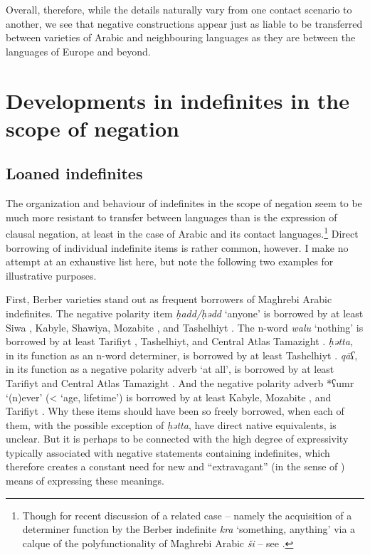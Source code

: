 \documentclass[output=paper]{langsci/langscibook}
\begin{document}
Overall, therefore, while the details naturally vary from one contact scenario to another, we see that negative constructions appear just as liable to be transferred between varieties of Arabic and neighbouring languages as they are between the languages of Europe and beyond.


\section{Developments in indefinites in the scope of negation}\label{sec:sco}


\subsection{Loaned indefinites}


The organization and behaviour of indefinites in the scope of negation seem to be much more resistant to transfer between languages than is the expression of clausal negation, at least in the case of Arabic and its contact languages.\footnote{Though for recent discussion of a related case – namely the acquisition of a determiner function by the Berber indefinite \textit{kra} ‘something, anything’ via a calque of the polyfunctionality of Maghrebi Arabic \textit{ši\-} – see \citet{Souag2018thing}.} Direct borrowing of individual indefinite items is rather common, however. I make no attempt at an exhaustive list here, but note the following two examples for illustrative purposes. 

First, Berber varieties stand out as frequent borrowers of Maghrebi Arabic indefinites. The negative polarity item \textit{ḥadd/ḥədd} ‘anyone’ is borrowed by at least Siwa \citep[58]{Souag2009}, Kabyle, Shawiya, Mozabite \citep[29]{Rabhi1996}, and Tashelhiyt \citep[41]{Boumalk1996}. The n-word \textit{walu} ‘nothing’ is borrowed by at least Tarifiyt \citep[54]{Lafkioui1996}, Tashelhiyt, and Central Atlas Tamazight \citep[41]{Boumalk1996}. \textit{ḥətta}, in its function as an n-word determiner, is borrowed by at least Tashelhiyt \citep[41]{Boumalk1996}. \textit{qāʕ}, in its function as a negative polarity adverb ‘at all’, is borrowed by at least Tarifiyt and Central Atlas Tamazight \citep[42]{Boumalk1996}. And the negative polarity adverb *ʕumr ‘(n)ever’ (< ‘age, lifetime’) is borrowed by at least Kabyle, Mozabite \citep[30]{Rabhi1996}, and Tarifiyt \citep[72]{Lafkioui1996}. Why these items should have been so freely borrowed, when each of them, with the possible exception of \textit{ḥətta}, have direct native equivalents, is unclear. But it is perhaps to be connected with the high degree of expressivity typically associated with negative statements containing indefinites, which therefore creates a constant need for new and “extravagant” (in the sense of \citealt{Haspelmath2000}) means of expressing these meanings.
\end{document}
